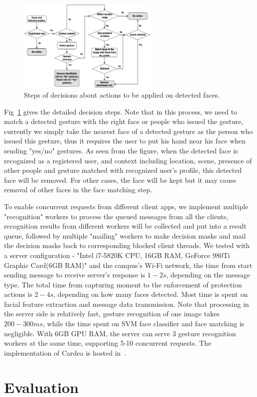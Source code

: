 \begin{description}[leftmargin=0cm]
\begin{figure}[!htbp]
    \centering
    \includegraphics[width=0.6\textwidth]{figure/ch4-decisiontree.pdf}
    \caption{Steps of decisions about actions to be applied on detected faces.}
    \label{fig:ch4-decisiontree}
\end{figure}

  \item[{Decision making:}] Fig~\ref{fig:ch4-decisiontree} gives the detailed decision steps. Note that in this process, we need to match a detected gesture with the right face or people who issued the gesture, currently we simply take the nearest face of a detected gesture as the person who issued this gesture, thus it requires the user to put his hand near his face when sending "yes/no" gestures. As seen from the figure, when the detected face is recognized as a registered user, and context including location, scene, presence of other people and gesture matched with recognized user's profile, this detected face will be removed. For other cases, the face will be kept but it may cause removal of other faces in the face matching step.


  \item[{Concurrent requests:}] To enable concurrent requests from different client apps, we implement multiple "recognition" workers to process the queued messages from all the clients, recognition results from different workers will be collected and put into a result queue, followed by multiple "mailing" workers to make decision masks and mail the decision masks back to corresponding blocked client threads. We tested with a server configuration - "Intel i7-5820K CPU, 16GB RAM, GeForce 980Ti Graphic Card(6GB RAM)" and the campus's Wi-Fi network, the time from start sending message to receive server's response is $1-2s$, depending on the message type. The total time from capturing moment to the enforcement of protection actions is $2-4s$, depending on how many faces detected. Most time is spent on facial feature extraction and message data transmission. Note that processing in the server side is relatively fast, gesture recognition of one image takes $200-300ms$, while the time spent on SVM face classifier and face matching is negligible. With 6GB GPU RAM, the server can serve 3 gesture recognition workers at the same time, supporting 5-10 concurrent requests. The implementation of Cardea is hosted in~\cite{links:cardeaproj}.

\end{description}
\section{Evaluation}


\newpage
